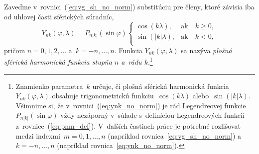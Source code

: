 \documentclass[a4paper, 12pt]{book}
\begin{document}
Zaveďme v~rovnici~(\ref{eq:vg_sh_no_norm}) substitúciu pre členy, ktoré závisia
iba od uhlovej časti sférických súradníc,
%
\begin{equation}
\label{eq:ynk_no_norm}
Y_{nk}(\varphi, \lambda) = P_{n|k|}(\sin\varphi)
%
\begin{cases}
\cos(k\lambda){,}    &\text{ak} \quad k \geq 0{,}\\
\sin(|k|\lambda){,}  &\text{ak} \quad k < 0{,}\\
\end{cases}
\end{equation}
%
pričom $n = 0, 1, 2, \dots$ a~$k = -n, \dots, n$.  Funkcia $Y_{nk}(\varphi,
\lambda)$ sa nazýva \emph{plošná sférická harmonická funkcia stupňa $n$ a~rádu
$k$}.\footnote{Znamienko parametra~$k$ určuje, či plošná sférická harmonická 
funkcia~$Y_{nk}(\varphi, \lambda)$ obsahuje trigonometrickú 
funkciu~$\cos(k\lambda)$ alebo~$\sin(|k|\lambda)$.  Všimnime si, že 
v~rovnici~(\ref{eq:ynk_no_norm}) je rád Legendreovej 
funkcie~$P_{n|k|}(\sin\varphi)$ vždy nezáporný v~súlade s~definíciou 
Legendreových funkcií z~rovnice~(\ref{eq:pnm_def}).  V~ďalších častiach práce 
je potrebné rozlišovať medzi indexmi~$m = 0, 1, \dots, n$ (napríklad 
rovnica~\ref{eq:vg_sh_no_norm}) a~$k = -n, \dots, n$ (napríklad 
rovnica~\ref{eq:ynk_no_norm}).}
\end{document}
